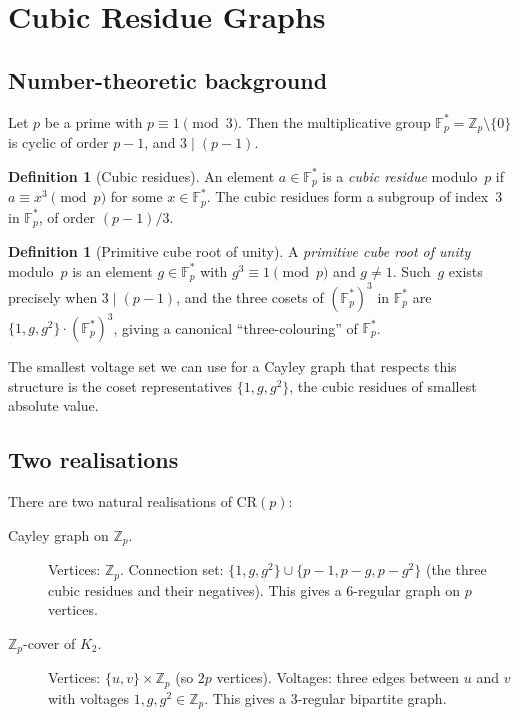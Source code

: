 \documentclass[11pt,a4paper]{article}
\theoremstyle{plain}
\theoremstyle{definition}
\newtheorem{definition}[theorem]{Definition}
\theoremstyle{remark}
\newcommand{\Z}{\mathbb{Z}}
\newcommand{\F}{\mathbb{F}}
\newcommand{\CR}{\mathrm{CR}}
\begin{document}
\section{Cubic Residue Graphs}
\label{sec:cubic-residues}

\subsection{Number-theoretic background}

Let $p$ be a prime with $p \equiv 1 \pmod{3}$. Then the multiplicative group
$\F_p^* = \Z_p \setminus \{0\}$ is cyclic of order $p-1$, and $3 \mid (p-1)$.

\begin{definition}[Cubic residues]
An element $a \in \F_p^*$ is a \emph{cubic residue} modulo~$p$ if
$a \equiv x^3 \pmod{p}$ for some $x \in \F_p^*$. The cubic residues
form a subgroup of index~3 in $\F_p^*$, of order $(p-1)/3$.
\end{definition}

\begin{definition}[Primitive cube root of unity]
A \emph{primitive cube root of unity} modulo~$p$ is an element
$g \in \F_p^*$ with $g^3 \equiv 1 \pmod{p}$ and $g \neq 1$.
Such~$g$ exists precisely when $3 \mid (p-1)$, and the three cosets of
$(\F_p^*)^3$ in $\F_p^*$ are $\{1, g, g^2\} \cdot (\F_p^*)^3$, giving a
canonical ``three-colouring'' of $\F_p^*$.
\end{definition}

The smallest voltage set we can use for a Cayley graph that respects this
structure is the coset representatives $\{1, g, g^2\}$, the cubic residues
of smallest absolute value.

\subsection{Two realisations}

There are two natural realisations of $\CR(p)$:

\begin{description}
\item[Cayley graph on $\Z_p$.] Vertices: $\Z_p$. Connection set:
  $\{1, g, g^2\} \cup \{p-1, p-g, p-g^2\}$ (the three cubic residues and
  their negatives). This gives a 6-regular graph on $p$ vertices.

\item[$\Z_p$-cover of $K_2$.] Vertices: $\{u, v\} \times \Z_p$ (so $2p$
  vertices). Voltages: three edges between $u$ and $v$ with voltages
  $1, g, g^2 \in \Z_p$. This gives a 3-regular bipartite graph.
\end{description}
\end{document}
